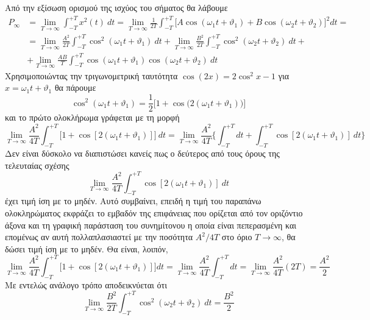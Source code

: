\documentclass[a4paper,twoside,10pt,openany]{memoir}
\theoremstyle{dotless}
\begin{document}
\begin{solution}
Από την εξίσωση ορισμού της ισχύος του σήματος θα λάβουμε
\begin{align*}
P_{\infty}&=\lim_{T\to\infty}\int_{-T}^{+T}x^2(t)\:dt=\lim_{T\to\infty}\frac{1}{2T}\int_{-T}^{+T}
\bigg[A\cos(\omega_1t+\vartheta_1)+B\cos(\omega_2t+\vartheta_2)\bigg]^2dt=\\&=
\lim_{T\to\infty}\frac{A^2}{2T}\int_{-T}^{+T}\cos^2(\omega_1t+\vartheta_1)\:dt+\lim_{T\to\infty}
\frac{B^2}{2T}\int_{-T}^{+T}\cos^2(\omega_2t+\vartheta_2)\:dt+\\&+
\lim_{T\to\infty}\frac{AB}{T}\int_{-T}^{+T}\cos(\omega_1t+\vartheta_1)\cos(\omega_2t+\vartheta_2)\:dt
\end{align*}
Χρησιμοποιώντας την τριγωνομετρική ταυτότητα $\cos(2x)=2\cos^2x-1$ για \mbox{$x=\omega_1t+\vartheta_1$} θα πάρουμε
\begin{equation*}
\cos^2(\omega_1t+\vartheta_1)=\frac{1}{2}\bigg[1+\cos\bigg(2(\omega_1t+\vartheta_1)\bigg)\bigg]
\end{equation*}
και το πρώτο ολοκλήρωμα γράφεται με τη μορφή
\begin{equation*}
\lim_{T\to\infty}\frac{A^2}{4T}\int_{-T}^{+T}\bigg[1+\cos[2(\omega_1t+\vartheta_1)]\bigg]\:dt=
\lim_{T\to\infty}\frac{A^2}{4T}\bigg\{\int_{-T}^{+T}dt+\int_{-T}^{+T}\cos[2(\omega_1t+\vartheta_1)]\:dt\bigg\}
\end{equation*}
Δεν είναι δύσκολο να διαπιστώσει κανείς πως ο δεύτερος από τους όρους της τελευταίας σχέσης
\begin{equation*}
\lim_{T\to\infty}\frac{A^2}{4T}\int_{-T}^{+T}\cos[2(\omega_1t+\vartheta_1)]\:dt
\end{equation*}
έχει τιμή ίση με το μηδέν. Αυτό συμβαίνει, επειδή η τιμή του παραπάνω ολοκληρώματος εκφράζει το εμβαδόν της επιφάνειας που ορίζεται από τον οριζόντιο άξονα και τη γραφική παράσταση του συνημίτονου η οποία είναι πεπερασμένη και επομένως αν αυτή πολλαπλασιαστεί με την ποσότητα $A^2/4T$ στο όριο $T\to\infty$, θα δώσει τιμή ίση με το μηδέν. Θα είναι, λοιπόν,
\begin{equation*}
\lim_{T\to\infty}\frac{A^2}{4T}\int_{-T}^{+T}\bigg[1+\cos[2(\omega_1t+\vartheta_1)]\bigg]dt=
\lim_{T\to\infty}\frac{A^2}{4T}\int_{-T}^{+T}dt=\lim_{T\to\infty}\frac{A^2}{4T}(2T)=\frac{A^2}{2}
\end{equation*}
Με εντελώς ανάλογο τρόπο αποδεικνύεται ότι
\begin{equation*}
\lim_{T\to\infty}
\frac{B^2}{2T}\int_{-T}^{+T}\cos^2(\omega_2t+\vartheta_2)\:dt=\frac{B^2}{2}
\end{equation*}

\end{solution}
\end{document}
